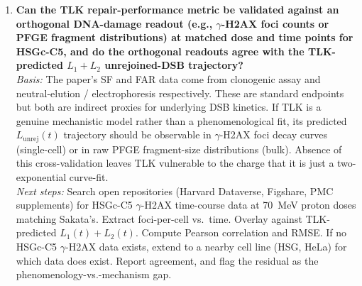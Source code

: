 \begin{enumerate}
\item \textbf{Can the TLK repair-performance metric be validated against an
orthogonal DNA-damage readout (e.g., $\gamma$-H2AX foci counts or PFGE fragment
distributions) at matched dose and time points for HSGc-C5, and do the orthogonal
readouts agree with the TLK-predicted $L_1 + L_2$ unrejoined-DSB trajectory?}\\
\textit{Basis:} The paper's SF and FAR data come from clonogenic assay and
neutral-elution / electrophoresis respectively. These are standard endpoints but
both are indirect proxies for underlying DSB kinetics. If TLK is a genuine
mechanistic model rather than a phenomenological fit, its predicted
$L_\mathrm{unrej}(t)$ trajectory should be observable in $\gamma$-H2AX foci decay
curves (single-cell) or in raw PFGE fragment-size distributions (bulk). Absence
of this cross-validation leaves TLK vulnerable to the charge that it is just a
two-exponential curve-fit.\\
\textit{Next steps:} Search open repositories (Harvard Dataverse, Figshare, PMC
supplements) for HSGc-C5 $\gamma$-H2AX time-course data at 70~MeV proton doses
matching Sakata's. Extract foci-per-cell vs.\ time. Overlay against TLK-predicted
$L_1(t)+L_2(t)$. Compute Pearson correlation and RMSE. If no HSGc-C5
$\gamma$-H2AX data exists, extend to a nearby cell line (HSG, HeLa) for which
data does exist. Report agreement, and flag the residual as the
phenomenology-vs.-mechanism gap.

\end{enumerate}

